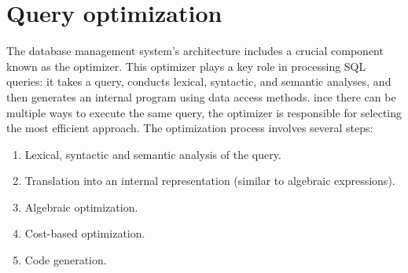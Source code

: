 \section{Query optimization}

The database management system's architecture includes a crucial component known as the optimizer. 
This optimizer plays a key role in processing SQL queries: it takes a query, conducts lexical, syntactic, and semantic analyses, and then generates an internal program using data access methods.
ince there can be multiple ways to execute the same query, the optimizer is responsible for selecting the most efficient approach.
The optimization process involves several steps:
\begin{enumerate}
    \item Lexical, syntactic and semantic analysis of the query.
    \item Translation into an internal representation (similar to algebraic expressions). 
    \item Algebraic optimization.
    \item Cost-based optimization.
    \item Code generation.
\end{enumerate}


